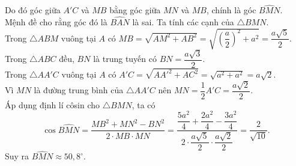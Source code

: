 \begin{ex}
{\begin{itemchoice}
			Do đó  góc giữa $A'C$ và $MB$ bằng góc giữa $MN$ và $MB$, chính là góc $\widehat{BMN}$. \\
			Mệnh đề cho rằng góc đó là $\widehat{BAN}$ là sai. 
			 \itemch Ta tính các cạnh của $\triangle BMN$.\\
			 Trong $\triangle ABM$ vuông tại $A$ có $MB=\sqrt{AM^2+AB^2}=\sqrt{\left(\dfrac{a}{2}\right)^2+a^2}=\dfrac{a\sqrt{5}}{2}$.\\
			Trong $\triangle ABC$ đều, $BN$ là trung tuyến có $BN=\dfrac{a\sqrt{3}}{2}$.\\ 
			Trong $\triangle  AA'C$ vuông tại $A$ có $A'C=\sqrt{AA'^2+A{C}^2}=\sqrt{a^2+a^2}=a\sqrt{2}$.\\
			Vì $MN$ là  đường trung bình của $\triangle AA'C$ nên $MN=\dfrac{1}{2}A'C=\dfrac{a\sqrt{2}}{2}$.\\
			Áp dụng định  lí côsin cho $\triangle BMN$, ta có
			$$\cos\widehat{BMN} = \dfrac{MB^2+MN^2-BN^2}{2\cdot MB \cdot MN} = \dfrac{\dfrac{5a^2}{4}+\dfrac{2a^2}{4}-\dfrac{3a^2}{4}}{2 \cdot \dfrac{a\sqrt{5}}{2} \cdot \dfrac{a\sqrt{2}}{2}}=\dfrac{2}{\sqrt{10}}.$$ 
			 Suy ra $\widehat{BMN} \approx 50{,}8^{\circ}$.
		\end{itemchoice}
	 }
\end{ex}

